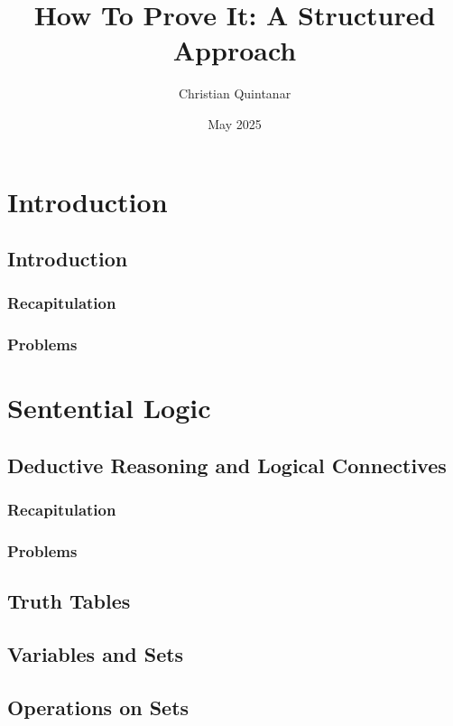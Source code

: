 \documentclass{report}
\title{How To Prove It: A Structured Approach}
\author{Christian Quintanar}
\date{May 2025}
\begin{document}
\maketitle

\chapter{Introduction}
\section{Introduction}
\subsection{Recapitulation}

\subsection{Problems}


\chapter{Sentential Logic}

\section{Deductive Reasoning and Logical Connectives}
\subsection{Recapitulation}

\subsection{Problems}


\section{Truth Tables}

\section{Variables and Sets}

\section{Operations on Sets}
\end{document}
